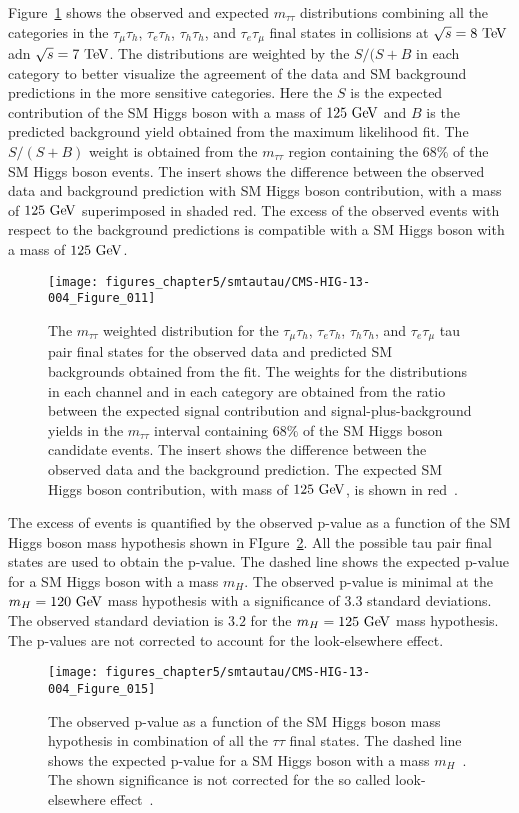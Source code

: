 Figure~\ref{fig:mass_plot} shows the observed and expected $m_{\tau\tau}$ distributions combining all the categories in the $\tau_{\mu}\tau_{h}$, $\tau_{e}\tau_{h}$, $\tau_{h}\tau_{h}$, and $\tau_{e}\tau_{\mu}$ final states in collisions at $\sqrt{s}=8~\mathrm{Te\kern -0.1em V}$ adn $\sqrt{s}=7~\mathrm{Te\kern -0.1em V}$. The distributions are weighted by the $S/(S+B$ in each category to better visualize the agreement of the data and SM background predictions in the more sensitive categories. Here the $S$ is the expected contribution of the SM Higgs boson with a mass of $125~\mathrm{Ge\kern -0.1em V}$ and $B$ is the predicted background yield obtained from the maximum likelihood fit. The $S/(S+B)$ weight is obtained from the $m_{\tau\tau}$ region containing the $68\%$ of the SM Higgs boson events. The insert shows the difference between the observed data and background prediction with SM Higgs boson contribution, with a mass of $125~\mathrm{Ge\kern -0.1em V}$  superimposed in shaded red. The excess of the observed events with respect to the background predictions is compatible with a SM Higgs boson with a mass of $125~\mathrm{Ge\kern -0.1em V}$.
\begin{figure}[htbp]
\centering
\texttt{[image: figures\_chapter5/smtautau/CMS-HIG-13-004\_Figure\_011]}
\caption{The $m_{\tau\tau}$ weighted distribution for the $\tau_{\mu}\tau_{h}$, $\tau_{e}\tau_{h}$, $\tau_{h}\tau_{h}$, and  $\tau_{e}\tau_{\mu}$ tau pair final states for the observed data and predicted SM backgrounds obtained from the fit. The weights for the distributions in each channel and in each category are obtained from the ratio between the expected signal contribution and signal-plus-background yields in the $m_{\tau\tau}$ interval containing $68\%$ of the SM Higgs boson candidate events. The insert shows the difference between the observed data and the background prediction. The expected SM Higgs boson contribution, with mass of $125~\mathrm{Ge\kern -0.1em V}$, is shown in red~\cite{Chatrchyan:2014nva}.}
\label{fig:mass_plot}
\end{figure}

The excess of events is quantified by the observed p-value as a function of the SM Higgs boson mass hypothesis shown in FIgure~\ref{fig:money}. All the possible tau pair final states are used to obtain the p-value. The dashed line shows the expected p-value for a SM Higgs boson with a mass $m_{H}$. The observed p-value is minimal at the $m_{H}=120~\mathrm{Ge\kern -0.1em V}$ mass hypothesis with a significance of $3.3$ standard deviations. The observed standard deviation is $3.2$ for the $m_{H}=125~\mathrm{Ge\kern -0.1em V}$ mass hypothesis. The p-values are not corrected to account for the look-elsewhere effect.
\begin{figure}[htbp]
\centering
\texttt{[image: figures\_chapter5/smtautau/CMS-HIG-13-004\_Figure\_015]}
\caption{The observed p-value as a function of the SM Higgs boson mass hypothesis in combination of all the $\tau\tau$ final states. The dashed line shows the expected p-value for a SM Higgs boson with a mass $m_{H}$~\cite{Chatrchyan:2014nva}. The shown significance is not corrected for the so called look-elsewhere effect~\cite{loook}.}
\label{fig:money}
\end{figure}

